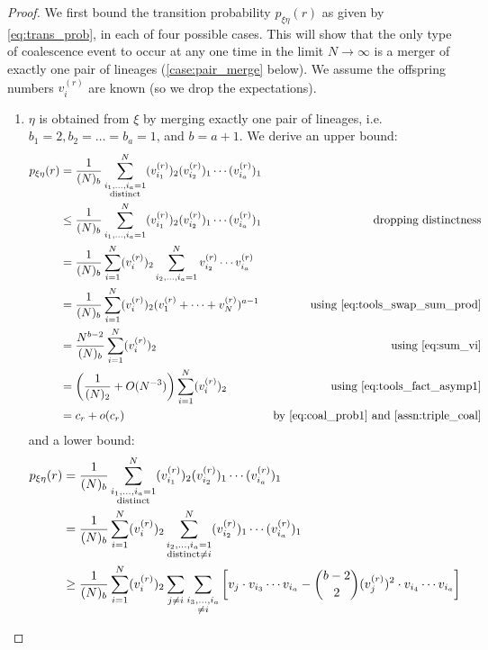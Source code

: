 \documentclass{article}
\begin{document}
\begin{proof}
We first bound the transition probability $p_{\xi\eta}(r)$ as given by \eqref{eq:trans_prob}, in each of four possible cases. This will show that the only type of coalescence event to occur at any one time in the limit $N\to\infty$ is a merger of exactly one pair of lineages (\ref{case:pair_merge} below). 
We assume the offspring numbers $v_i^{(r)}$ are known (so we drop the expectations).
\begin{enumerate}[label = \textbf{Case \arabic*.}]
\item\label{case:pair_merge} $\eta$ is obtained from $\xi$ by merging exactly one pair of lineages, i.e.\ $b_1=2, b_2=\dots=b_a=1$, and $b=a+1$. We derive an upper bound:
\begin{align}
p_{\xi\eta}(r) &= \frac{1}{(N)_b} \sum_{\substack{i_1,\dots,i_a =1 \\ \text{distinct}}}^{N} (v_{i_1}^{(r)})_2(v_{i_2}^{(r)})_1\cdots (v_{i_a}^{(r)})_1 &\notag\\
&\leq \frac{1}{(N)_b} \sum_{i_1,\dots,i_a=1}^N (v_{i_1}^{(r)})_2 (v_{i_2}^{(r)})_1 \cdots (v_{i_a}^{(r)})_1 &\text{dropping distinctness} \notag\\
&= \frac{1}{(N)_b} \sum_{i=1}^N (v_i^{(r)})_2 \sum_{i_2,\dots,i_a=1}^N v_{i_2}^{(r)} \cdots v_{i_a}^{(r)} & \notag\\
&= \frac{1}{(N)_b} \sum_{i=1}^N (v_i^{(r)})_2 (v_1^{(r)} + \dots + v_N^{(r)})^{a-1} & \text{using \eqref{eq:tools_swap_sum_prod}} \notag\\
&= \frac{N^{b-2}}{(N)_b} \sum_{i=1}^N (v_i^{(r)})_2 & \text{using \eqref{eq:sum_vi}} \notag\\
&= \left( \frac{1}{(N)_2} + O(N^{-3}) \right) \sum_{i=1}^N (v_i^{(r)})_2 & \text{using \eqref{eq:tools_fact_asymp1}} \notag\\
&= c_r + o(c_r) & \text{by \eqref{eq:coal_prob1} and \ref{assn:triple_coal}} \notag
\end{align}
and a lower bound:
\begin{align}
p_{\xi\eta}(r) &= \frac{1}{(N)_b} \sum_{\substack{i_1,\dots,i_a =1 \\ \text{distinct}}}^{N} (v_{i_1}^{(r)})_2(v_{i_2}^{(r)})_1\cdots (v_{i_a}^{(r)})_1 &\notag\\
&= \frac{1}{(N)_b} \sum_{i=1}^N (v_i^{(r)})_2 \sum_{\substack{i_2,\dots,i_a =1 \\ \text{distinct} \neq i }}^{N} (v_{i_2}^{(r)})_1\cdots (v_{i_a}^{(r)})_1 &\notag\\
&\geq \frac{1}{(N)_b} \sum_{i=1}^N (v_i^{(r)})_2 \sum_{j\neq i} \sum_{\substack{i_3,\dots,i_a\\ \neq i}}\left[ v_j\cdot v_{i_3}\cdots v_{i_a} - \binom{b-2}{2}(v_j^{(r)})^2 \cdot v_{i_4}\cdots v_{i_a} \right] & \label{eq:transprob_lowerbd}\\

\end{align}
\end{enumerate}
\end{proof}
\end{document}
